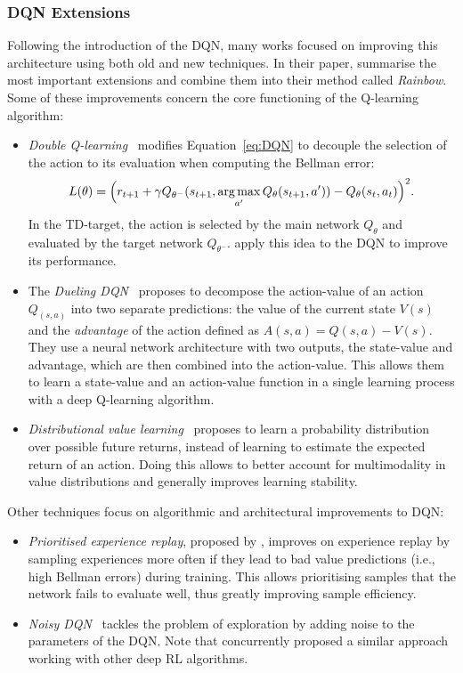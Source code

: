 \subsubsection{DQN Extensions}\label{sec:DRL:Rainbow}

Following the introduction of the DQN, many works focused on improving this architecture using both old and new techniques. In their paper, \citet{Hessel2018_Rainbow} summarise the most important extensions and combine them into their method called \textit{Rainbow}. Some of these improvements concern the core functioning of the Q-learning algorithm:
\begin{itemize}
    \item \textit{Double Q-learning}~\citep{Hasselt2010_DoubleQlearning} modifies Equation~\ref{eq:DQN} to decouple the selection of the action to its evaluation when computing the Bellman error:
    \begin{equation}
        L(\theta)=\Bigl(r_{t+1}+\gamma Q_{{\theta^-}}(s_{t+1},\operatorname*{arg\,max}_{a'}Q_\theta(s_{t+1},a'))-Q_\theta(s_t,a_t)\Bigl)^2.
        \label{eq:DDQN}
    \end{equation}
    In the TD-target, the action is selected by the main network $Q_\theta$ and evaluated by the target network $Q_{\theta^-}$. \citet{Hasselt2016_DoubleDQN} apply this idea to the DQN to improve its performance.

    \item The \textit{Dueling DQN}~\citep{Wang2016_DuelingDQN} proposes to decompose the action-value of an action $Q_(s,a)$ into two separate predictions: the value of the current state $V(s)$ and the \textit{advantage} of the action defined as $A(s,a)=Q(s,a)-V(s)$. They use a neural network architecture with two outputs, the state-value and advantage, which are then combined into the action-value. This allows them to learn a state-value and an action-value function in a single learning process with a deep Q-learning algorithm. 

    \item \textit{Distributional value learning}~\citep{Bellemare2017_DistributionalRL} proposes to learn a probability distribution over possible future returns, instead of learning to estimate the expected return of an action. Doing this allows to better account for multimodality in value distributions and generally improves learning stability. 
\end{itemize}
Other techniques focus on algorithmic and architectural improvements to DQN:
\begin{itemize}
    \item \textit{Prioritised experience replay}, proposed by \citet{Schaul2016_PER}, improves on experience replay by sampling experiences more often if they lead to bad value predictions (i.e., high Bellman errors) during training. This allows prioritising samples that the network fails to evaluate well, thus greatly improving sample efficiency. 

    \item \textit{Noisy DQN}~\citep{Fortunato2018_NoisyDQN} tackles the problem of exploration by adding noise to the parameters of the DQN. Note that \citet{Plappert2018_Noise} concurrently proposed a similar approach working with other deep RL algorithms. 
\end{itemize}
